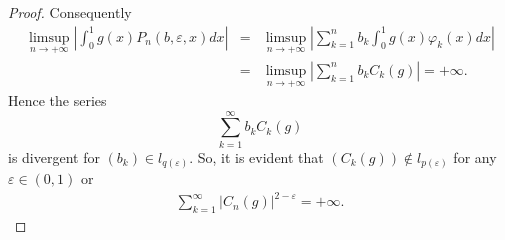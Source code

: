 \documentclass[10pt,a4paper]{amsart}
\begin{document}
\begin{proof}
		Consequently
		\begin{eqnarray*}
			\limsup_{n \rightarrow +\infty}\left|\int_{0}^{1} g(x)  P_n(b, \varepsilon,x)dx\right| 
			&=&	\limsup_{n \rightarrow +\infty}\left|\sum_{k=1}^{n} b_k \int_{0}^{1} g(x)  \varphi_{k}(x)dx\right| \\ 
			&=& \limsup_{n \rightarrow +\infty}\left|\sum_{k=1}^{n} b_k C_k(g)\right| =+ \infty.
		\end{eqnarray*}
		Hence the series 
		$$\sum_{k=1}^{\infty} b_k C_k(g)$$
		is divergent for $(b_k)\in l_{q(\varepsilon)} .$ So, it is evident that  $(C_k (g))\notin l_{p(\varepsilon)}$ for any $\varepsilon \in (0,1)$ or
		\begin{eqnarray*}
			\sum_{k=1}^{\infty} \left|C_n(g)\right|^{2-\varepsilon} =+\infty.
		\end{eqnarray*}
		
	\end{proof}
\end{document}
